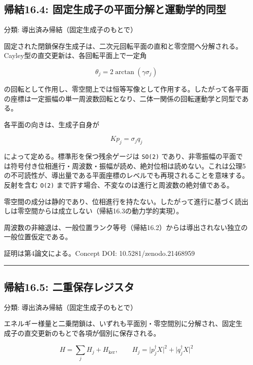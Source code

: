 \documentclass[
  a4paper,
]{ltjsarticle}
\begin{document}
\subsection{帰結16.4:
固定生成子の平面分解と運動学的同型}\label{ux5e30ux7d5016.4-ux56faux5b9aux751fux6210ux5b50ux306eux5e73ux9762ux5206ux89e3ux3068ux904bux52d5ux5b66ux7684ux540cux578b}

分類: 導出済み帰結（固定生成子のもとで）

固定された閉鎖保存生成子は、二次元回転平面の直和と零空間へ分解される。Cayley型の直交更新は、各回転平面上で一定角

\[
\theta_j=2\arctan(\gamma\sigma_j)
\]

の回転として作用し、零空間上では恒等写像として作用する。したがって各平面の座標は一定振幅の単一周波数回転となり、二体一関係の回転運動学と同型である。

各平面の向きは、生成子自身が

\[
Kp_j=\sigma_j q_j
\]

によって定める。標準形を保つ残余ゲージは \texttt{SO(2)}
であり、非零振幅の平面では符号付き位相進行・周波数・振幅が読め、絶対位相は読めない。これは公理5の不可読性が、導出量である平面座標のレベルでも再現されることを意味する。反射を含む
\texttt{O(2)} まで許す場合、不変なのは進行と周波数の絶対値である。

零空間の成分は静的であり、位相進行を持たない。したがって進行に基づく読出しは零空間からは成立しない（帰結16.3の動力学的実現）。

周波数の非縮退は、一般位置ランク等号（帰結16.2）からは導出されない独立の一般位置仮定である。

証明は第4論文による。Concept DOI: 10.5281/zenodo.21468959

\begin{center}\rule{0.5\linewidth}{0.5pt}\end{center}

\subsection{帰結16.5:
二重保存レジスタ}\label{ux5e30ux7d5016.5-ux4e8cux91cdux4fddux5b58ux30ecux30b8ux30b9ux30bf}

分類: 導出済み帰結（固定生成子のもとで）

エネルギー様量と二乗閉鎖は、いずれも平面別・零空間別に分解され、固定生成子の直交更新のもとで各項が個別に保存される。

\[
H=\sum_{j}H_j+H_{\ker},
\qquad
H_j=\lvert p_j^\dagger X\rvert^2+\lvert q_j^\dagger X\rvert^2
\]
\end{document}
